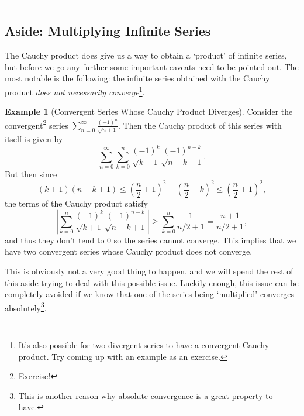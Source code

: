 \documentclass[11pt, a4paper]{article}
\theoremstyle{definition}
\newtheorem*{example*}{Example}
\newenvironment{aside}[1]{
	\noindent
    \rule{\textwidth}{0.025cm}
    \vspace{-1.75\baselineskip}
    \subsection*{#1}}
{\noindent\rule{\textwidth}{0.025cm}}
\begin{document}
\begin{aside}{Aside: Multiplying Infinite Series}
The Cauchy product does give us a way to obtain a `product' of infinite series, but before we go any further some important caveats need to be pointed out. The most notable is the following: the infinite series obtained with the Cauchy product \emph{does not necessarily converge}\footnote{It's also possible for two divergent series to have a convergent Cauchy product. Try coming up with an example as an exercise.}.

\begin{example*}[Convergent Series Whose Cauchy Product Diverges]
	Consider the convergent\footnote{Exercise!} series $\sum_{n = 0}^{\infty} \frac{(-1)^n}{\sqrt{n + 1}}$. Then the Cauchy product of this series with itself is given by
	$$
	\sum_{n = 0}^{\infty} \sum_{k = 0}^n \frac{(-1)^k}{\sqrt{k + 1}} \frac{(-1)^{n - k}}{\sqrt{n - k + 1}}.
	$$
	But then since
	$$
	(k + 1)(n - k + 1) \leq \left(\frac{n}{2} + 1\right)^2 - \left(\frac{n}{2} - k\right)^2 \leq \left(\frac{n}{2} + 1\right)^2,
	$$
	the terms of the Cauchy product satisfy
	$$
	\left|\sum_{k = 0}^n \frac{(-1)^k}{\sqrt{k + 1}} \frac{(-1)^{n - k}}{\sqrt{n - k + 1}}\right| \geq \sum_{k = 0}^n \frac{1}{n/2 + 1} = \frac{n + 1}{n/2 + 1},
	$$
	and thus they don't tend to 0 so the series cannot converge. This implies that we have two convergent series whose Cauchy product does not converge.
\end{example*}

	

This is obviously not a very good thing to happen, and we will spend the rest of this aside trying to deal with this possible issue.
Luckily enough, this issue can be completely avoided if we know that one of the series being `multiplied' converges absolutely\footnote{This is another reason why absolute convergence is a great property to have.}.


\end{aside}
\end{document}
